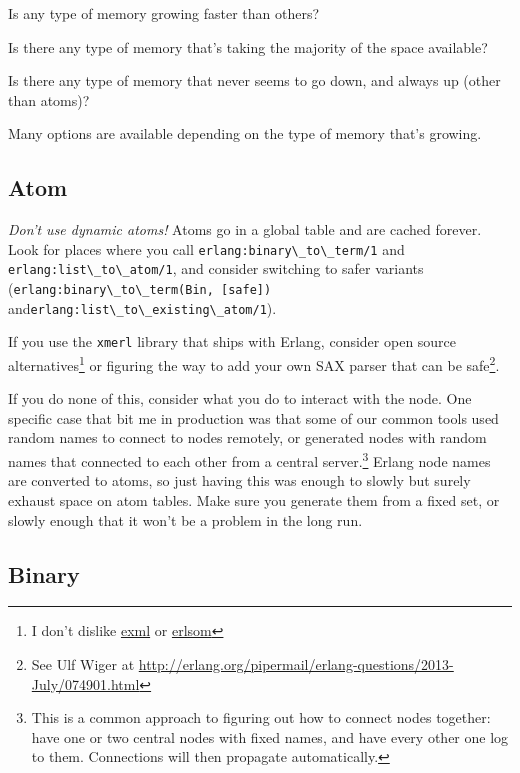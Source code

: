 \documentclass[11pt, oneside]{book}   	%
\newcommand{\otpapp}[1]{\Verb`#1`}
\newcommand{\function}[1]{\Verb`#1`}
\newcommand{\expression}[1]{\Verb`#1`}
\begin{document}
\begin{itemize*}
	\item Is any type of memory growing faster than others?
	\item Is there any type of memory that's taking the majority of the space available?
	\item Is there any type of memory that never seems to go down, and always up (other than atoms)?
\end{itemize*}

Many options are available depending on the type of memory that's growing.

\subsection{Atom}

\emph{Don't use dynamic atoms!} Atoms go in a global table and are cached forever. Look for places where you call \function{erlang:binary\_to\_term/1} and \function{erlang:list\_to\_atom/1}, and consider switching to safer variants (\expression{erlang:binary\_to\_term(Bin, [safe])} and\newline \function{erlang:list\_to\_existing\_atom/1}).

If you use the \otpapp{xmerl} library that ships with Erlang, consider open source alternatives\footnote{I don't dislike \href{https://github.com/paulgray/exml}{exml} or \href{https://github.com/willemdj/erlsom}{erlsom}} or figuring the way to add your own SAX parser that can be safe\footnote{See Ulf Wiger at \href{http://erlang.org/pipermail/erlang-questions/2013-July/074901.html}{http://erlang.org/pipermail/erlang-questions/2013-July/074901.html}}. 

If you do none of this, consider what you do to interact with the node. One specific case that bit me in production was that some of our common tools used random names to connect to nodes remotely, or generated nodes with random names that connected to each other from a central server.\footnote{This is a common approach to figuring out how to connect nodes together: have one or two central nodes with fixed names, and have every other one log to them. Connections will then propagate automatically.} Erlang node names are converted to atoms, so just having this was enough to slowly but surely exhaust space on atom tables. Make sure you generate them from a fixed set, or slowly enough that it won't be a problem in the long run.

\subsection{Binary}
\end{document}
